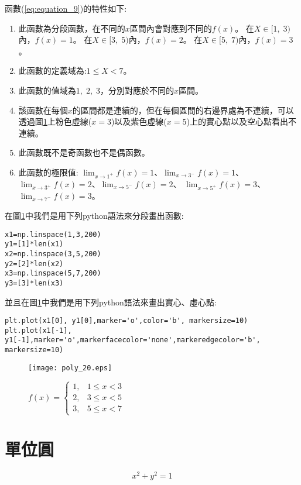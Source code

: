 \documentclass[12pt, a4paper]{article}
\begin{document}
函數\;(\ref{eq:equation_9})\;的特性如下\;:
\begin{enumerate}
\item 此函數為分段函數，在不同的\;$x$\;區間內會對應到不同的\;$f(x)$\;。
\subitem 在\;$X \in [1,\;3)$\;內，\;$f(x)=1$\;。
\subitem 在\;$X \in [3,\;5)$\;內，\;$f(x)=2$\;。
\subitem 在\;$X \in [5,\;7)$\;內，\;$f(x)=3$\;。
\item 此函數的定義域為\;:\;$1 \leq X<7$\;。
\item 此函數的值域為\;${1,\;2,\;3}$\;，分別對應於不同的\;$x$\;區間。
\item 該函數在每個\;$x$\;的區間都是連續的，但在每個區間的右邊界處為不連續，可以透過圖\;\ref{fig:poly_20.eps}\;上粉色虛線(\;$x=3$\;)以及紫色虛線(\;$x=5$\;)上的實心點以及空心點看出不連續。
\item 此函數既不是奇函數也不是偶函數。
\item 此函數的極限值\;:
\subitem $ \lim_{x\rightarrow 1^+} f(x) = 1$\;、\;$ \lim_{x\rightarrow 3^-} f(x) = 1$、
\subitem $ \lim_{x\rightarrow 3^+} f(x) = 2$\;、\;$ \lim_{x\rightarrow 5^-} f(x) = 2$、
\subitem $ \lim_{x\rightarrow 5^+} f(x) = 3$\;、\;$ \lim_{x\rightarrow 7^-} f(x) = 3$。
\end{enumerate}

在圖\;\ref{fig:poly_20.eps}\;中我們是用下列python語法來分段畫出函數\;:
\begin{lstlisting}
x1=np.linspace(1,3,200)
y1=[1]*len(x1)
x2=np.linspace(3,5,200)
y2=[2]*len(x2)
x3=np.linspace(5,7,200)
y3=[3]*len(x3)
\end{lstlisting}
並且在圖\;\ref{fig:poly_20.eps}\;中我們是用下列python語法來畫出實心、虛心點\;:
\begin{lstlisting}
plt.plot(x1[0], y1[0],marker='o',color='b', markersize=10)
plt.plot(x1[-1], y1[-1],marker='o',markerfacecolor='none',markeredgecolor='b', markersize=10)
\end{lstlisting}

\begin{figure}[H]
\centering
\texttt{[image: poly\_20.eps]}
\caption{$f(x) =\begin{cases}1, & 1 \leq x < 3 \\2, &3 \leq x < 5 \\3, &5 \leq x < 7 \end{cases}$}
\label{fig:poly_20.eps}
\end{figure}

\section{單位圓}
\begin{equation}\label{eq:equation_10}
x^2+y^2=1
\end{equation}
\end{document}
